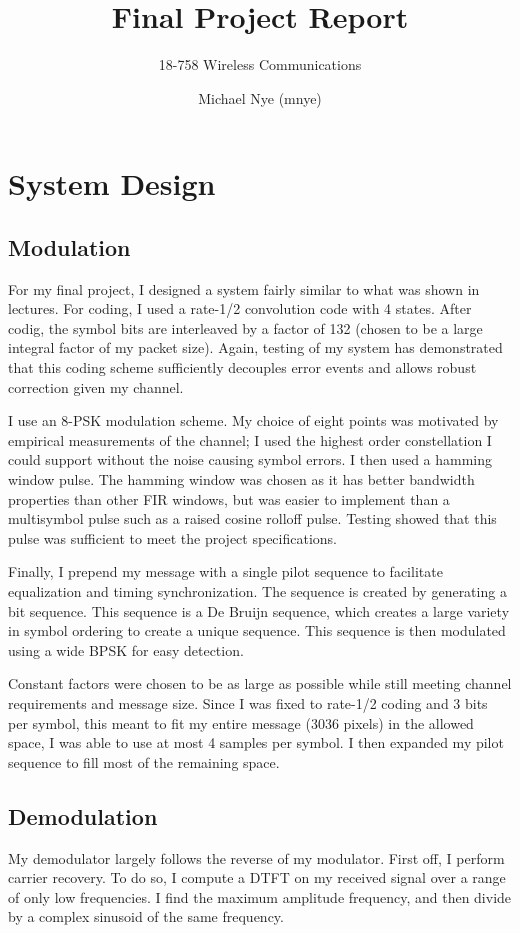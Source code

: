 \documentclass[11pt]{scrartcl}
\begin{document}
\title{Final Project Report}
\subtitle{18-758 Wireless Communications}
\author{Michael Nye (mnye)}
\date{}
\maketitle



\section*{System Design}

\subsection*{Modulation}
For my final project, I designed a system fairly similar to what was shown in
lectures. For coding, I used a rate-1/2 convolution code with 4 states. After
codig, the symbol bits are interleaved by a factor of 132 (chosen to be a large
integral factor of my packet size). Again, testing of my system has demonstrated
that this coding scheme sufficiently decouples error events and allows robust
correction given my channel.

I use an 8-PSK modulation scheme. My choice of eight points was
motivated by empirical measurements of the channel; I used the highest order
constellation I could support without the noise causing symbol errors. I then
used a hamming window pulse. The hamming window was chosen as it has better
bandwidth properties than other FIR windows, but was easier to implement than
a multisymbol pulse such as a raised cosine rolloff pulse. Testing showed that
this pulse was sufficient to meet the project specifications.

Finally, I prepend my message with a single pilot sequence to facilitate
equalization and timing synchronization. The sequence is created by generating
a bit sequence. This sequence is a De Bruijn sequence, which creates a large
variety in symbol ordering to create a unique sequence. This sequence is then
modulated using a wide BPSK for easy detection.

Constant factors were chosen to be as large as possible while still meeting 
channel requirements and message size. Since I was fixed to rate-1/2 coding
and 3 bits per symbol, this meant to fit my entire message (3036 pixels) in
the allowed space, I was able to use at most 4 samples per symbol. I then
expanded my pilot sequence to fill most of the remaining space.


\subsection*{Demodulation}
My demodulator largely follows the reverse of my modulator. First off, I perform
carrier recovery. To do so, I compute a DTFT on my received signal over a range
of only low frequencies. I find the maximum amplitude frequency, and then
divide by a complex sinusoid of the same frequency.
\end{document}
